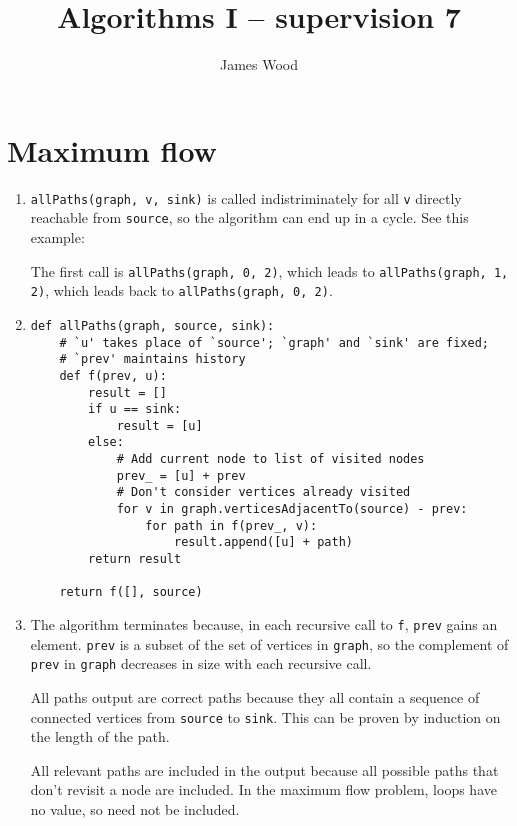 \documentclass[11pt]{article}
\title{\textbf{Algorithms I -- supervision 7}}
\author{James Wood}
\begin{document}
\renewcommand{\labelenumi}{(\alph{enumi})}
\renewcommand{\labelenumii}{(\roman{enumii})}

\maketitle

\section{Maximum flow}
\begin{enumerate}
\item
  \texttt{allPaths(graph, v, sink)} is called indistriminately for all \texttt{v} directly reachable from \texttt{source}, so the algorithm can end up in a cycle. See this example:


  The first call is \texttt{allPaths(graph, 0, 2)}, which leads to \texttt{allPaths(graph, 1, 2)}, which leads back to \texttt{allPaths(graph, 0, 2)}.
\item
  \begin{lstlisting}
def allPaths(graph, source, sink):
    # `u' takes place of `source'; `graph' and `sink' are fixed;
    # `prev' maintains history
    def f(prev, u):
        result = []
        if u == sink:
            result = [u]
        else:
            # Add current node to list of visited nodes
            prev_ = [u] + prev
            # Don't consider vertices already visited
            for v in graph.verticesAdjacentTo(source) - prev:
                for path in f(prev_, v):
                    result.append([u] + path)
        return result

    return f([], source)
  \end{lstlisting}
\item
  The algorithm terminates because, in each recursive call to \texttt{f}, \texttt{prev} gains an element. \texttt{prev} is a subset of the set of vertices in \texttt{graph}, so the complement of \texttt{prev} in \texttt{graph} decreases in size with each recursive call.

  All paths output are correct paths because they all contain a sequence of connected vertices from \texttt{source} to \texttt{sink}. This can be proven by induction on the length of the path.

  All relevant paths are included in the output because all possible paths that don't revisit a node are included. In the maximum flow problem, loops have no value, so need not be included.
\end{enumerate}
\end{document}
